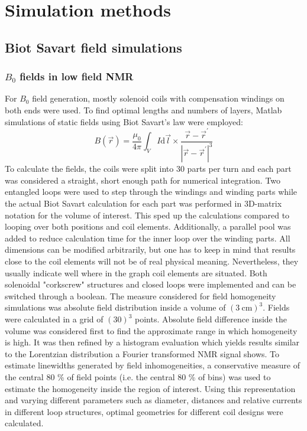 \section{Simulation methods}\label{chapter:simulations}
\subsection{Biot Savart field simulations}
\subsubsection{$B_0$ fields in low field NMR}\label{simulations:B0}
\label{sec:simulations:B0sim}
        For $B_0$ field generation, mostly solenoid coils with compensation windings on both ends were used. To find optimal lengths and numbers of layers, Matlab simulations of static fields using Biot Savart's law were employed:
        \begin{equation}
            B(\vec r) = \frac{\mu_0}{4\pi} \int_V I\mathrm{d} \vec l \times \frac{\vec r - \vec r^{'}}{\left|\vec r - \vec r^{'}\right|^3}
        \end{equation}
        To calculate the fields, the coils were split into 30 parts per turn and each part was considered a straight, short enough path for numerical integration. Two entangled loops were used to step through the windings and winding parts while the actual Biot Savart calculation for each part was performed in  3D-matrix notation for the volume of interest. This sped up the calculations compared to looping over both positions and coil elements. Additionally, a parallel pool was added to reduce calculation time for the inner loop over the winding parts.
        All dimensions can be modified arbitrarily, but one has to keep in mind that results close to the coil elements will not be of real physical meaning. Nevertheless, they usually indicate well where in the graph coil elements are situated.  Both solenoidal "corkscrew" structures and closed loops were implemented and can be switched through a boolean. The measure considered for field homogeneity simulations was absolute field distribution inside a volume of $(\SI{3}{\centi\meter})^3$. Fields were calculated in a grid of $(30)^3$ points. Absolute field difference inside the volume was considered first to find the approximate range in which homogeneity is high. It was then refined by a histogram evaluation which yields results similar to the Lorentzian distribution a Fourier transformed NMR signal shows. To estimate linewidths generated by field inhomogeneities, a conservative measure of the central 80 \% of field points (i.e. the central 80 \% of bins) was used to estimate the homogeneity inside the region of interest.  Using this representation and varying different parameters such as diameter, distances and relative currents in different loop structures, optimal geometries for different coil designs were calculated.
